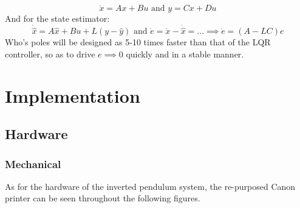 \documentclass[12pt]{article}
\begin{document}
\begin{equation}
    \dot{x} = Ax + Bu \textrm{ and }
    y = Cx + Du
\end{equation}
And for the state estimator:
\begin{equation}
    \dot{\hat{x}} = A\hat{x} + Bu + L(y-\hat{y}) \textrm{ and }
    \dot{e} = \dot{x} - \dot{\hat{x}} = ... \implies \dot{e} = (A - LC)e
    \label{eq}
\end{equation}
Who's poles will be designed as 5-10 times faster than that of the LQR controller, so as to drive \textbf{$e\implies0$} quickly and in a stable manner.

\section{Implementation}
\subsection{Hardware}
\subsubsection{Mechanical}
As for the hardware of the inverted pendulum system, the re-purposed Canon printer can be seen throughout the following figures.
\end{document}

